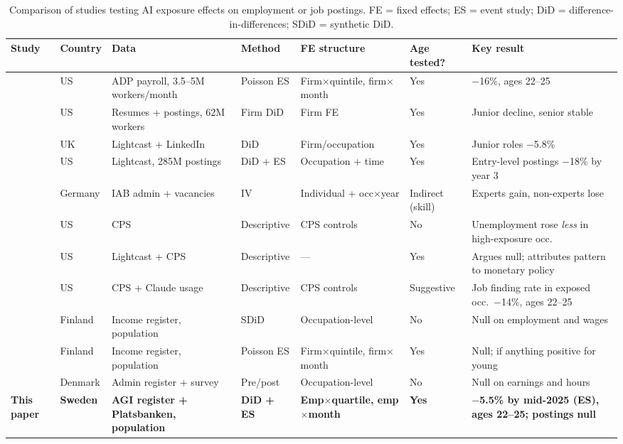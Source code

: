 \documentclass[preprint,12pt,authoryear]{elsarticle}
\begin{document}
\begin{landscape}
\begin{table}[htbp]
\centering
\caption{Comparison of studies testing AI exposure effects on employment or job postings. FE = fixed effects; ES = event study; DiD = difference-in-differences; SDiD = synthetic DiD.}
\label{tab:literature}
\scriptsize
\begin{tabular}{@{}p{3.0cm}lp{2.1cm}p{1.7cm}p{2.3cm}p{1.6cm}p{4.3cm}@{}}
\toprule
Study & Country & Data & Method & FE structure & Age tested? & Key result \\
\midrule
\citet{brynjolfsson2025canaries} & US & ADP payroll, 3.5--5M workers/month & Poisson ES & Firm$\times$quintile, firm$\times$month & Yes & $-$16\%, ages 22--25 \\[4pt]
\citet{hosseini2025seniority} & US & Resumes + postings, 62M workers & Firm DiD & Firm FE & Yes & Junior decline, senior stable \\[4pt]
\citet{kleinteeselink2025} & UK & Lightcast + LinkedIn & DiD & Firm/occupation & Yes & Junior roles $-$5.8\% \\[4pt]
\citet{liu2025labor} & US & Lightcast, 285M postings & DiD + ES & Occupation + time & Yes & Entry-level postings $-$18\% by year 3 \\[4pt]
\citet{storm2025ai} & Germany & IAB admin + vacancies & IV & Individual + occ$\times$year & Indirect (skill) & Experts gain, non-experts lose \\[4pt]
\citet{eckhardt2025aijobs} & US & CPS & Descriptive & CPS controls & No & Unemployment rose \emph{less} in high-exposure occ. \\[4pt]
\citet{iscenko2026ladder} & US & Lightcast + CPS & Descriptive & --- & Yes & Argues null; attributes pattern to monetary policy \\[4pt]
\citet{massenkoff2026labor} & US & CPS + Claude usage & Descriptive & CPS controls & Suggestive & Job finding rate in exposed occ.\ $-$14\%, ages 22--25 \\[4pt]
\citet{kauhanen2025canaries} & Finland & Income register, population & SDiD & Occupation-level & No & Null on employment and wages \\[4pt]
\citet{kauhanen2026youth} & Finland & Income register, population & Poisson ES & Firm$\times$quintile, firm$\times$month & Yes & Null; if anything positive for young \\[4pt]
\citet{humlum2025llm} & Denmark & Admin register + survey & Pre/post & Occupation-level & No & Null on earnings and hours \\[4pt]
\textbf{This paper} & \textbf{Sweden} & \textbf{AGI register + Platsbanken, population} & \textbf{DiD + ES} & \textbf{Emp$\times$quartile, emp$\times$month} & \textbf{Yes} & \textbf{$-$5.5\% by mid-2025 (ES), ages 22--25; postings null} \\
\bottomrule
\end{tabular}
\end{table}
\end{landscape}
\end{document}
